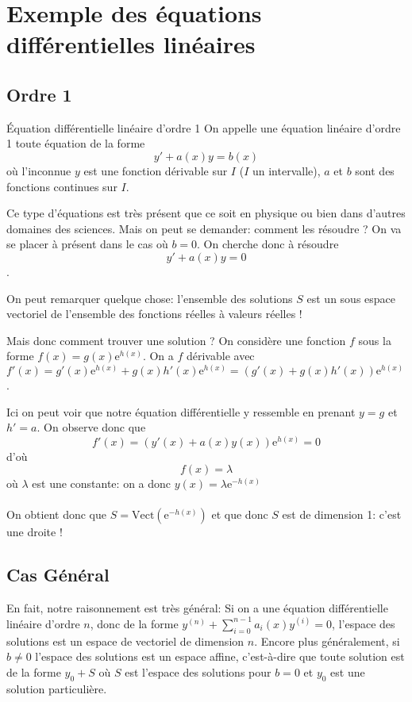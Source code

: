 \documentclass{classe}
\begin{document}
\section{Exemple des équations différentielles linéaires}
\subsection{Ordre 1}

\begin{définition}{Équation différentielle linéaire d'ordre 1}{}
On appelle une équation linéaire d'ordre 1 toute équation de la forme
$$y' + a(x)y = b(x)$$
où l'inconnue $y$ est une fonction dérivable sur $I$ ($I$ un intervalle), $a$ et $b$ sont des fonctions continues sur $I$.
\end{définition}

Ce type d'équations est très présent que ce soit en physique ou bien dans d'autres domaines des sciences. Mais on peut se demander: comment les résoudre ? On va se placer à présent dans le cas où $b=0$. On cherche donc à résoudre
$$y' + a(x)y = 0$$.

On peut remarquer quelque chose: l'ensemble des solutions $S$ est un sous espace vectoriel de l'ensemble des fonctions réelles à valeurs réelles !

Mais donc comment trouver une solution ? On considère une fonction $f$ sous la forme $f(x) = g(x)\mathrm{e}^{h(x)}$. On a $f$ dérivable avec $f'(x) = g'(x)\mathrm{e}^{h(x)} + g(x)h'(x)\mathrm{e}^{h(x)} = (g'(x) + g(x)h'(x))\mathrm{e}^{h(x)}$.

Ici on peut voir que notre équation différentielle y ressemble en prenant $y = g$ et $h' = a$. On observe donc que
$$f'(x) = (y'(x) + a(x)y(x))\mathrm{e}^{h(x)} = 0$$
d'où
$$f(x) = \lambda$$
où $\lambda$ est une constante: on a donc $y(x) = \lambda\mathrm{e}^{-h(x)}$
\\\\
On obtient donc que $S = \mathrm{Vect}(\mathrm{e}^{-h(x)})$ et que donc $S$ est de dimension 1: c'est une droite !

\subsection{Cas Général}
En fait, notre raisonnement est très général:
Si on a une équation différentielle linéaire d'ordre $n$, donc de la forme $y^{(n)} + \sum_{i = 0}^{n - 1} a_{i}(x)y^{(i)} = 0$, l'espace des solutions est un espace de vectoriel de dimension $n$.
Encore plus généralement, si $b \neq 0$ l'espace des solutions est un espace affine, c'est-à-dire que toute solution est de la forme $y_{0} + S$ où $S$ est l'espace des solutions pour $b = 0$ et $y_{0}$ est une solution particulière.
\end{document}
